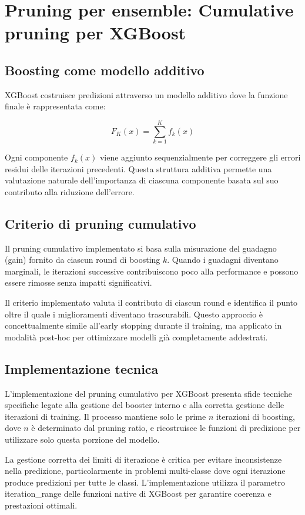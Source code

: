 \documentclass[a4paper,12pt]{report}
\begin{document}
	\section{Pruning per ensemble: Cumulative pruning per XGBoost}
	
	\subsection{Boosting come modello additivo}
	XGBoost costruisce predizioni attraverso un modello additivo dove la funzione finale è rappresentata come:
	
	\[
	F_K(x) = \sum_{k=1}^K f_k(x)
	\]
	
	Ogni componente $f_k(x)$ viene aggiunto sequenzialmente per correggere gli errori residui delle iterazioni precedenti. Questa struttura additiva permette una valutazione naturale dell'importanza di ciascuna componente basata sul suo contributo alla riduzione dell'errore.
	
	\subsection{Criterio di pruning cumulativo}
	Il pruning cumulativo implementato si basa sulla misurazione del guadagno (gain) fornito da ciascun round di boosting $k$. Quando i guadagni diventano marginali, le iterazioni successive contribuiscono poco alla performance e possono essere rimosse senza impatti significativi.
	
	Il criterio implementato valuta il contributo di ciascun round e identifica il punto oltre il quale i miglioramenti diventano trascurabili. Questo approccio è concettualmente simile all'early stopping durante il training, ma applicato in modalità post-hoc per ottimizzare modelli già completamente addestrati.
	
	\subsection{Implementazione tecnica}
	L'implementazione del pruning cumulativo per XGBoost presenta sfide tecniche specifiche legate alla gestione del booster interno e alla corretta gestione delle iterazioni di training. Il processo mantiene solo le prime $n$ iterazioni di boosting, dove $n$ è determinato dal pruning ratio, e ricostruisce le funzioni di predizione per utilizzare solo questa porzione del modello.
	
	La gestione corretta dei limiti di iterazione è critica per evitare inconsistenze nella predizione, particolarmente in problemi multi-classe dove ogni iterazione produce predizioni per tutte le classi. L'implementazione utilizza il parametro iteration\_range delle funzioni native di XGBoost per garantire coerenza e prestazioni ottimali.
	
\end{document}
